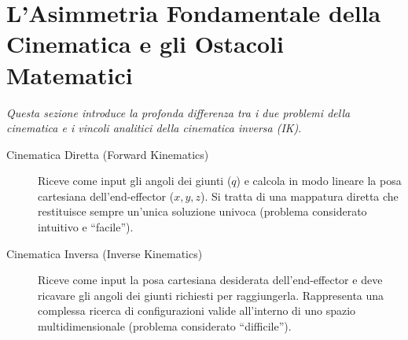 %

%
\section{L'Asimmetria Fondamentale della Cinematica e gli Ostacoli Matematici}
\emph{Questa sezione introduce la profonda differenza tra i due problemi della cinematica e i vincoli analitici della cinematica inversa (IK)}.
\begin{description}
    \item [Cinematica Diretta (Forward Kinematics)] Riceve come input gli angoli dei giunti ($q$) e calcola in modo lineare la posa cartesiana dell'end-effector ($x, y, z$). Si tratta di una mappatura diretta che restituisce sempre un'unica soluzione univoca (problema considerato intuitivo e ``facile'').
    \item [Cinematica Inversa (Inverse Kinematics)] Riceve come input la posa cartesiana desiderata dell'end-effector e deve ricavare gli angoli dei giunti richiesti per raggiungerla. Rappresenta una complessa ricerca di configurazioni valide all'interno di uno spazio multidimensionale (problema considerato ``difficile'').
\end{description}
%
